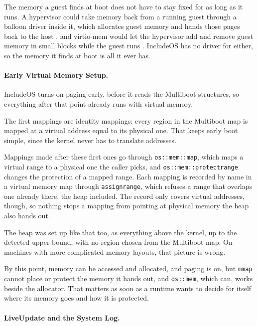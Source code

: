 \documentclass[12pt]{report}
\renewcommand{\_}{\origunderscore\allowbreak}
\begin{document}
The memory a guest finds at boot does not have to stay fixed for as long as it runs. A hypervisor could take memory back from a running guest through a balloon driver inside it, which allocates guest memory and hands those pages back to the host \cite{waldspurger2002esx}, and virtio-mem would let the hypervisor add and remove guest memory in small blocks while the guest runs \cite{hildenbrand2021virtiomem}. IncludeOS has no driver for either, so the memory it finds at boot is all it ever has.

\paragraph{Early Virtual Memory Setup.}

IncludeOS turns on paging early, before it reads the Multiboot structures, so everything after that point already runs with virtual memory.

The first mappings are identity mappings: every region in the Multiboot map is mapped at a virtual address equal to its physical one. That keeps early boot simple, since the kernel never has to translate addresses.

Mappings made after these first ones go through \texttt{os::mem::map}, which maps a virtual range to a physical one the caller picks, and \texttt{os::mem::protect\_range} changes the protection of a mapped range. Each mapping is recorded by name in a virtual memory map through \texttt{assign\_range}, which refuses a range that overlaps one already there, the heap included. The record only covers virtual addresses, though, so nothing stops a mapping from pointing at physical memory the heap also hands out.

The heap was set up like that too, as everything above the kernel, up to the detected upper bound, with no region chosen from the Multiboot map. On machines with more complicated memory layouts, that picture is wrong.

By this point, memory can be accessed and allocated, and paging is on, but \texttt{mmap} cannot place or protect the memory it hands out, and \texttt{os::mem}, which can, works beside the allocator. That matters as soon as a runtime wants to decide for itself where its memory goes and how it is protected.

\paragraph{LiveUpdate and the System Log.}
\end{document}
